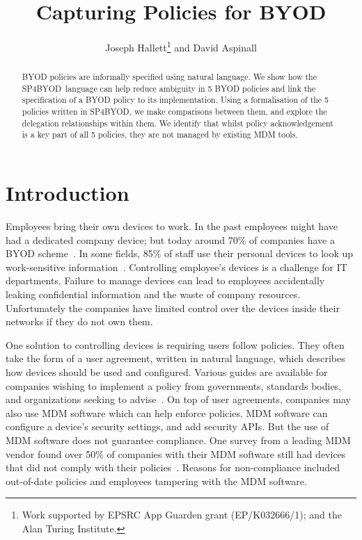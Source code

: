\documentclass{llncs}
\title{Capturing Policies for BYOD}
\author{Joseph Hallett\thanks{Work supported by EPSRC App Guarden grant (EP/K032666/1); and the Alan Turing Institute.} and David Aspinall}
\institute{School of Informatics, University of Edinburgh}
\newcommand{\AppPAL}[0]{SP4BYOD}
\begin{document}
\maketitle
\begin{abstract}
  BYOD policies are informally specified using natural language.
  We show how the \AppPAL~language can help reduce ambiguity in 5 BYOD policies and link the specification of a BYOD policy to its implementation.
  Using a formalisation of the 5 policies written in \AppPAL, we make comparisons between them, and explore the delegation relationships within them.
  We identify that whilst policy acknowledgement is a key part of all 5 policies, they are not managed by existing MDM tools.
\end{abstract}
\section{Introduction}
\label{sec:intro}

Employees bring their own devices to work.
In the past employees might have had a dedicated company device; 
  but today around 70\% of companies have a BYOD scheme~\cite{schulze_byod_2016}. 
In some fields, 85\% of staff use their personal devices to look up work-sensitive information~\cite{patel_uk_2015}.
Controlling employee's devices is a challenge for IT departments.
Failure to manage devices can lead to employees accidentally leaking confidential information and the waste of company resources.
Unfortunately the companies have limited control over the devices inside their networks if they do not own them.

One solution to controlling devices is requiring users follow policies.
They often take the form of a user agreement, written in natural language, which describes how devices should be used and configured.
Various guides are available for companies wishing to implement a policy from governments, standards bodies, and organizations seeking to advise~\cite{nicholas_r._c._guerin_security_2008,souppaya_guidelines_????,cesg_byod_2015}.
On top of user agreements, companies may also use \ac{MDM} software which can help enforce policies.
\ac{MDM} software can configure a device's security settings, and add security APIs.
But the use of \ac{MDM} software does not guarantee compliance.
One survey from a leading MDM vendor found over 50\% of companies with their \ac{MDM} software still had devices that did not comply with their policies~\cite{mobileiron_security_labs_q4_2015}.
Reasons for non-compliance included out-of-date policies and employees tampering with the \ac{MDM} software.
\end{document}
